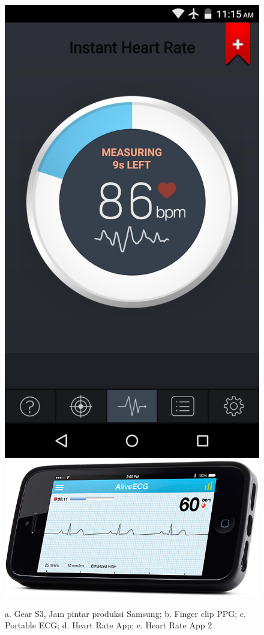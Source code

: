 \begin{figure}[H]
	\includegraphics[scale=0.05]{images/heart_app1.jpg}
	\includegraphics[scale=0.2]{images/heart_app2.jpg}
    \caption{a. Gear S3, Jam pintar produksi Samsung; b. Finger clip PPG; c. Portable ECG; d. Heart Rate App; e. Heart Rate App 2}
\end{figure}

